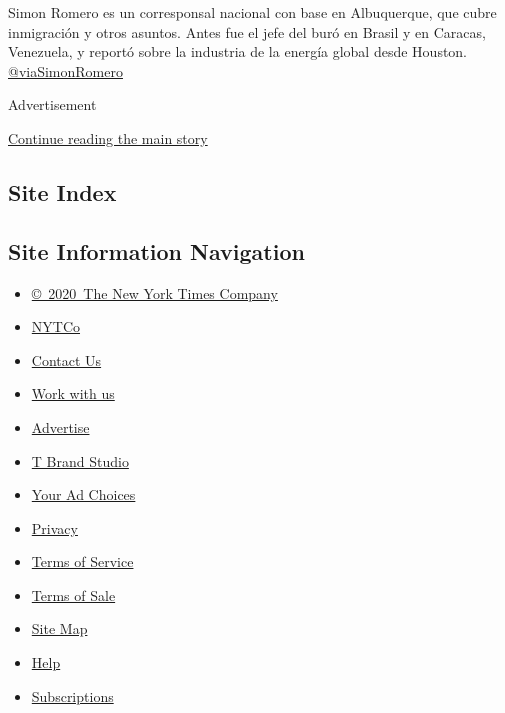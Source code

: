 Simon Romero es un corresponsal nacional con base en Albuquerque, que
cubre inmigración y otros asuntos. Antes fue el jefe del buró en Brasil
y en Caracas, Venezuela, y reportó sobre la industria de la energía
global desde Houston.
\href{https://twitter.com/viaSimonRomero}{@viaSimonRomero}

Advertisement

\protect\hyperlink{after-bottom}{Continue reading the main story}

\hypertarget{site-index}{%
\subsection{Site Index}\label{site-index}}

\hypertarget{site-information-navigation}{%
\subsection{Site Information
Navigation}\label{site-information-navigation}}

\begin{itemize}
\tightlist
\item
  \href{https://help.nytimes3xbfgragh.onion/hc/en-us/articles/115014792127-Copyright-notice}{©~2020~The
  New York Times Company}
\end{itemize}

\begin{itemize}
\tightlist
\item
  \href{https://www.nytco.com/}{NYTCo}
\item
  \href{https://help.nytimes3xbfgragh.onion/hc/en-us/articles/115015385887-Contact-Us}{Contact
  Us}
\item
  \href{https://www.nytco.com/careers/}{Work with us}
\item
  \href{https://nytmediakit.com/}{Advertise}
\item
  \href{http://www.tbrandstudio.com/}{T Brand Studio}
\item
  \href{https://www.nytimes3xbfgragh.onion/privacy/cookie-policy\#how-do-i-manage-trackers}{Your
  Ad Choices}
\item
  \href{https://www.nytimes3xbfgragh.onion/privacy}{Privacy}
\item
  \href{https://help.nytimes3xbfgragh.onion/hc/en-us/articles/115014893428-Terms-of-service}{Terms
  of Service}
\item
  \href{https://help.nytimes3xbfgragh.onion/hc/en-us/articles/115014893968-Terms-of-sale}{Terms
  of Sale}
\item
  \href{https://spiderbites.nytimes3xbfgragh.onion}{Site Map}
\item
  \href{https://help.nytimes3xbfgragh.onion/hc/en-us}{Help}
\item
  \href{https://www.nytimes3xbfgragh.onion/subscription?campaignId=37WXW}{Subscriptions}
\end{itemize}
